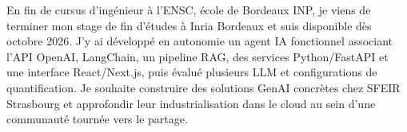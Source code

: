 
\begin{cvparagraph}
En fin de cursus d’ingénieur à l’ENSC, école de Bordeaux INP, je viens de terminer mon stage de fin d’études à Inria Bordeaux et suis disponible dès octobre 2026. J’y ai développé en autonomie un agent IA fonctionnel associant l’API OpenAI, LangChain, un pipeline RAG, des services Python/FastAPI et une interface React/Next.js, puis évalué plusieurs LLM et configurations de quantification. Je souhaite construire des solutions GenAI concrètes chez SFEIR Strasbourg et approfondir leur industrialisation dans le cloud au sein d’une communauté tournée vers le partage.
\end{cvparagraph}
